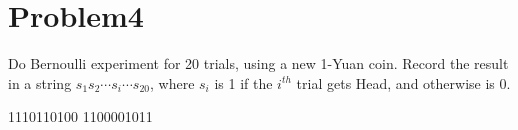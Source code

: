 \documentclass[12pt]{article}
\begin{document}
\section{Problem4}
Do Bernoulli experiment for 20 trials, using a new 1-Yuan coin. Record the result in a
string $s_1s_2 \cdots s_i \cdots s_{20}$, where $s_i$ is 1 if the $i^{th}$ trial gets Head, and otherwise is 0.

1110110100 1100001011
\end{document}
